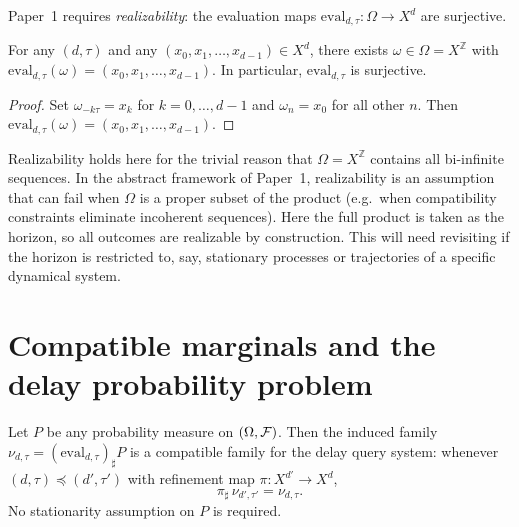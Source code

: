 Paper~1 requires \emph{realizability}: the evaluation maps
$\mathrm{eval}_{d,\tau} : \Omega \to X^d$ are surjective.

\begin{proposition}[Realizability]\label{prop:realizability}
For any $(d, \tau)$ and any $(x_0, x_1, \ldots, x_{d-1}) \in X^d$,
there exists $\omega \in \Omega = X^{\mathbb{Z}}$ with
$\mathrm{eval}_{d,\tau}(\omega) = (x_0, x_1, \ldots, x_{d-1})$.
In particular, $\mathrm{eval}_{d,\tau}$ is surjective.
\end{proposition}

\begin{proof}
Set $\omega_{-k\tau} = x_k$ for $k = 0, \ldots, d-1$ and $\omega_n = x_0$
for all other $n$.  Then $\mathrm{eval}_{d,\tau}(\omega) =
(x_0, x_1, \ldots, x_{d-1})$.
\end{proof}

\begin{remark}
Realizability holds here for the trivial reason that $\Omega = X^{\mathbb{Z}}$
contains all bi-infinite sequences.  In the abstract framework of Paper~1,
realizability is an assumption that can fail when $\Omega$ is a proper
subset of the product (e.g.\ when compatibility constraints eliminate
incoherent sequences).  Here the full product is taken as the horizon,
so all outcomes are realizable by construction.  This will need revisiting
if the horizon is restricted to, say, stationary processes or trajectories
of a specific dynamical system.
\end{remark}

\section{Compatible marginals and the delay probability problem}
\label{sec:compatible}

\begin{proposition}\label{prop:compat}
Let $P$ be any probability measure on $(\Omega, \mathcal{F})$.  Then the induced
family $\nu_{d,\tau} = (\mathrm{eval}_{d,\tau})_\sharp P$ is a compatible
family for the delay query system: whenever $(d,\tau) \preceq (d',\tau')$
with refinement map $\pi : X^{d'} \to X^d$,
\[
  \pi_\sharp\, \nu_{d',\tau'} = \nu_{d,\tau}.
\]
No stationarity assumption on $P$ is required.
\end{proposition}

